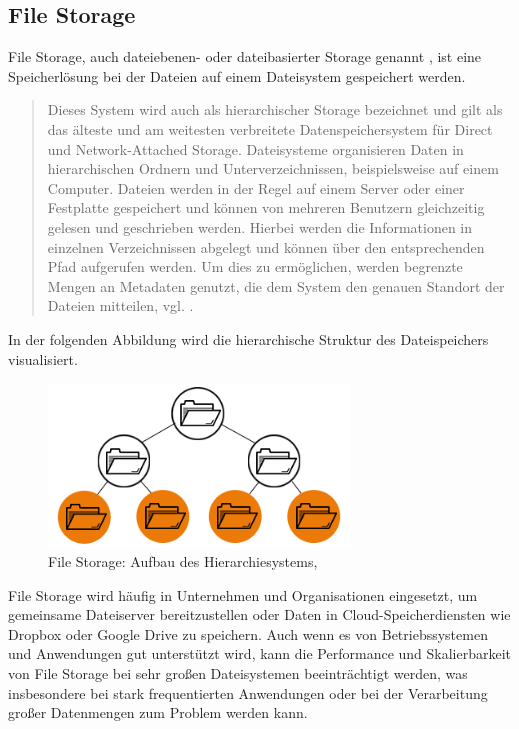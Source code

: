 \subsection{File Storage}

File Storage, auch dateiebenen- oder dateibasierter Storage genannt \cite{redHat-storage}, ist eine Speicherlösung bei der Dateien auf einem Dateisystem gespeichert werden. 

\begin{quote}
	Dieses System wird auch als hierarchischer Storage bezeichnet und gilt als das älteste und am weitesten verbreitete Datenspeichersystem für Direct und Network-Attached Storage. Dateisysteme organisieren Daten in hierarchischen Ordnern und Unterverzeichnissen, beispielsweise auf einem Computer. Dateien werden in der Regel auf einem Server oder einer Festplatte gespeichert und können von mehreren Benutzern gleichzeitig gelesen und geschrieben werden. Hierbei werden die Informationen in einzelnen Verzeichnissen abgelegt und können über den entsprechenden Pfad aufgerufen werden. Um dies zu ermöglichen, werden begrenzte Mengen an Metadaten genutzt, die dem System den genauen Standort der Dateien mitteilen, vgl. \citeauthor{redHat-storage}.
\end{quote}

In der folgenden Abbildung wird die hierarchische Struktur des Dateispeichers visualisiert.

\begin{figure}[h]
\centering
	\includegraphics[width=8cm,keepaspectratio]{Pictures/FileStorageHierarchy.png}
	\caption{File Storage: Aufbau des Hierarchiesystems, \citeauthor{redHat-storage}}
\end{figure}

File Storage wird häufig in Unternehmen und Organisationen eingesetzt, um gemeinsame Dateiserver bereitzustellen oder Daten in Cloud-Speicherdiensten wie Dropbox oder Google Drive zu speichern.
Auch wenn es von Betriebssystemen und Anwendungen gut unterstützt wird, kann die Performance und Skalierbarkeit von File Storage bei sehr großen Dateisystemen beeinträchtigt werden, was insbesondere bei stark frequentierten Anwendungen oder bei der Verarbeitung großer Datenmengen zum Problem werden kann. 

